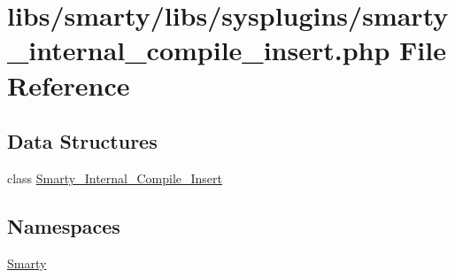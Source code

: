 \hypertarget{smarty__internal__compile__insert_8php}{}\section{libs/smarty/libs/sysplugins/smarty\+\_\+internal\+\_\+compile\+\_\+insert.php File Reference}
\label{smarty__internal__compile__insert_8php}
\subsection*{Data Structures}
\begin{DoxyCompactItemize}
\item 
class \hyperlink{class_smarty___internal___compile___insert}{Smarty\+\_\+\+Internal\+\_\+\+Compile\+\_\+\+Insert}
\end{DoxyCompactItemize}
\subsection*{Namespaces}
\begin{DoxyCompactItemize}
\item 
 \hyperlink{namespace_smarty}{Smarty}
\end{DoxyCompactItemize}
